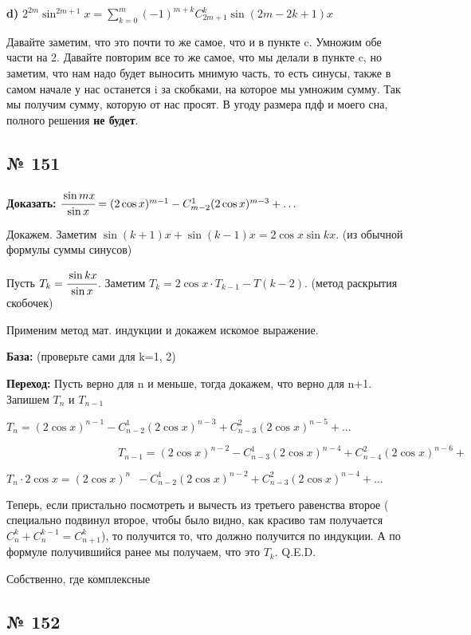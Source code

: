 \documentclass{article}
\begin{document}
\textbf{d)} $2^{2m}\sin^{2m+1}x = \sum \limits_{k=0}^m (-1)^{m+k}  C_{2m+1}^k \sin (2m-2k+1)x$ 

Давайте заметим, что это почти то же самое, что и в пункте c. Умножим обе части на 2. Давайте повторим все то же самое, что мы делали в пункте c, но заметим, что нам надо будет выносить мнимую часть, то есть синусы, также в самом начале у нас останется i за скобками, на которое мы умножим сумму. Так мы получим сумму, которую от нас просят. В угоду размера пдф и моего сна, полного решения \textbf{не будет}.
    
 \pagebreak

 \subsection{№ 151}
 
\textbf{Доказать:} $\cfrac{\sin mx}{\sin x}=(2\cos x)^{m-1}-C_{m-2}^1(2\cos x)^{m-3} + \ldots$

 Докажем. Заметим $\sin (k+1)x + \sin (k-1)x = 2 \cos x \sin kx$. (из обычной формулы суммы синусов)

Пусть $T_k =\cfrac{\sin kx}{\sin x}$. Заметим $T_k = 2 \cos x \cdot T_{k-1} - T(k-2)$. (метод раскрытия скобочек) 

Применим метод мат. индукции и докажем искомое выражение.

\textbf{База:} (проверьте сами для k=1, 2)

\textbf{Переход:} Пусть верно для n и меньше, тогда докажем, что верно для n+1. Запишем $T_n$ и $T_{n-1}$

$T_n = (2\cos x)^{n-1}-C_{n-2}^1(2\cos x)^{n-3} + C_{n-3}^2(2 \cos x)^{n-5}  + \ldots$

$\quad \quad \quad \quad\quad \quad\quad \quad\quad \quad T_{n-1} = (2\cos x)^{n-2}-C_{n-3}^1(2\cos x)^{n-4} + C_{n-4}^2(2 \cos x)^{n-6}  +$

$T_n \cdot 2 \cos x = (2\cos x)^{n} \, \, \,-C_{n-2}^1(2\cos x)^{n-2} + C_{n-3}^2(2 \cos x)^{n-4}  + \ldots$

Теперь, если пристально посмотреть и вычесть из третьего равенства второе ( специально подвинул второе, чтобы было видно, как красиво там получается $C_n^k + C_n^{k-1} = C_{n+1}^k$), то получится то, что должно получится по индукции. А по формуле получившийся ранее мы получаем, что это $T_k$. Q.E.D.

Собственно, где комплексные

\pagebreak
\subsection{№ 152}
\end{document}
